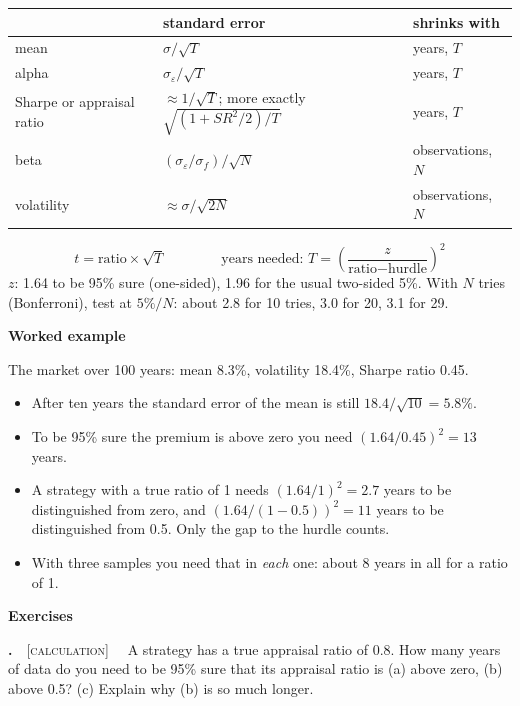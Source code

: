 \documentclass[11pt]{article}
\newcounter{ex}[section]
\renewcommand{\theex}{\thesection.\arabic{ex}}
\newenvironment{ex}[1][calculation]{\refstepcounter{ex}\par\medskip\textbf{\theex}\ \ {\small\textsc{[#1]}}\ \ }{\par}
\newcommand{\head}[1]{\par\medskip\textbf{#1}\par}
\newcommand{\SR}{\mathit{SR}}
\begin{document}
\begin{keybox}
\begin{center}
\begin{tabular}{lll}
\toprule
 & standard error & shrinks with \\
\midrule
mean & $\sigma/\sqrt{T}$ & years, $T$ \\
alpha & $\sigma_{\varepsilon}/\sqrt{T}$ & years, $T$ \\
Sharpe or appraisal ratio & $\approx 1/\sqrt{T}$; more exactly $\sqrt{(1 + \SR^{2}/2)/T}$ & years, $T$ \\
beta & $(\sigma_{\varepsilon}/\sigma_{f})/\sqrt{N}$ & observations, $N$ \\
volatility & $\approx \sigma/\sqrt{2N}$ & observations, $N$ \\
\bottomrule
\end{tabular}
\end{center}
\[ t = \text{ratio}\times\sqrt{T} \qquad\qquad
   \text{years needed: } T = \left(\frac{z}{\text{ratio} - \text{hurdle}}\right)^{2} \]
{\small $z$: 1.64 to be 95\% sure (one-sided), 1.96 for the usual two-sided 5\%. With $N$ tries (Bonferroni), test at
$5\%/N$: about 2.8 for 10 tries, 3.0 for 20, 3.1 for 29.}
\end{keybox}

\head{Worked example}
The market over 100 years: mean 8.3\%, volatility 18.4\%, Sharpe ratio 0.45.
\begin{itemize}
\item After ten years the standard error of the mean is still $18.4/\sqrt{10} = 5.8\%$.
\item To be 95\% sure the premium is above zero you need $(1.64/0.45)^{2} = 13$ years.
\item A strategy with a true ratio of 1 needs $(1.64/1)^{2} = 2.7$ years to be distinguished from zero, and
$(1.64/(1 - 0.5))^{2} = 11$ years to be distinguished from 0.5. Only the gap to the hurdle counts.
\item With three samples you need that in \emph{each} one: about 8 years in all for a ratio of 1.
\end{itemize}

\head{Exercises}

\begin{ex}\label{ex:7.1}
A strategy has a true appraisal ratio of 0.8. How many years of data do you need to be 95\% sure that its appraisal
ratio is (a) above zero, (b) above 0.5? (c) Explain why (b) is so much longer.
\end{ex}
\end{document}

